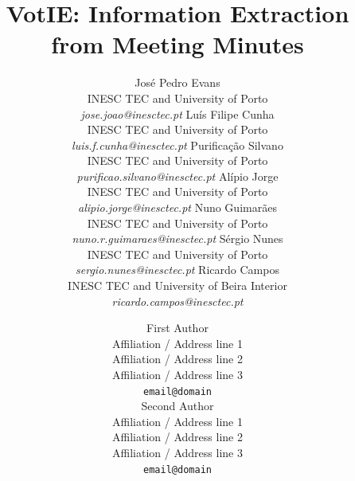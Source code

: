 \documentclass[11pt]{article}
\title{VotIE: Information Extraction from Meeting Minutes}
\author{José Pedro Evans \\ INESC TEC and University of Porto \\  \textit{jose.joao@inesctec.pt} \And
 Luís Filipe Cunha \\ INESC TEC and University of Porto \\\textit{luis.f.cunha@inesctec.pt} \AND
 Purificação Silvano \\ INESC TEC and University of Porto \\ \textit{purificao.silvano@inesctec.pt} \And
 Alípio Jorge \\ INESC TEC and University of Porto\\ \textit{alipio.jorge@inesctec.pt} \AND
Nuno Guimarães \\ INESC TEC and University of Porto \\ \textit{nuno.r.guimaraes@inesctec.pt} \And
Sérgio Nunes \\ INESC TEC and University of Porto \\ \textit{sergio.nunes@inesctec.pt}  \AND
Ricardo Campos \\ INESC TEC and University of Beira Interior \\ \textit{ricardo.campos@inesctec.pt}}
\author{First Author \\
  Affiliation / Address line 1 \\
  Affiliation / Address line 2 \\
  Affiliation / Address line 3 \\
  \texttt{email@domain} \\\And
  Second Author \\
  Affiliation / Address line 1 \\
  Affiliation / Address line 2 \\
  Affiliation / Address line 3 \\
  \texttt{email@domain} \\}
\begin{document}
\maketitle

\vspace{-5.5cm} 


\begin{abstract}



\end{abstract}
\end{document}
